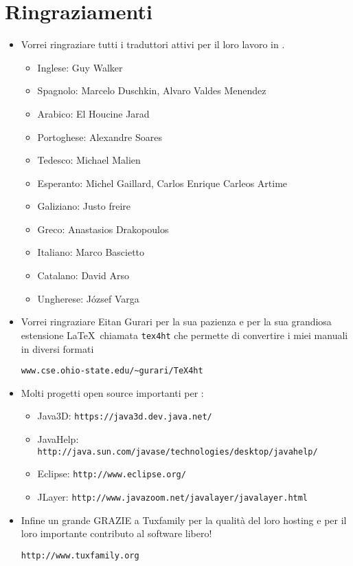 \chapter*{Ringraziamenti}
\begin{itemize}
	\item Vorrei ringraziare tutti i traduttori attivi per il loro lavoro in \xlogo.
	\vspace{0.2cm}
	\begin{itemize}
		\item Inglese: Guy Walker
		\item Spagnolo: Marcelo Duschkin, Alvaro Valdes Menendez
		\item Arabico: El Houcine Jarad
		\item Portoghese: Alexandre Soares
		\item Tedesco: Michael Malien
		\item Esperanto: Michel Gaillard, Carlos Enrique Carleos Artime
		\item Galiziano: Justo freire
		\item Greco: Anastasios Drakopoulos
		\item Italiano: Marco Bascietto
		\item Catalano: David Arso 
		\item Ungherese: József Varga
	\end{itemize}
	\vspace{0.5cm}
	\item Vorrei ringraziare Eitan Gurari per la sua pazienza e per la sua grandiosa estensione \LaTeX\ chiamata \texttt{tex4ht} che permette di convertire i miei manuali in diversi formati
	\begin{center}
		\texttt{www.cse.ohio-state.edu/\textasciitilde gurari/TeX4ht} 
	\end{center}
	\vspace{0.5cm}
	\item Molti progetti open source importanti per \xlogo:
	\vspace{0.2cm}
	\begin{itemize}
		\item Java3D: \texttt{https://java3d.dev.java.net/} \\
		\vspace{0.2cm}
		\item JavaHelp: \texttt{http://java.sun.com/javase/technologies/desktop/javahelp/} \\
		\vspace{0.2cm}
		\item Eclipse: \texttt{http://www.eclipse.org/} \\
		\vspace{0.2cm}
		\item JLayer: \texttt{http://www.javazoom.net/javalayer/javalayer.html} \\
	\end{itemize}
	\vspace{0.2cm}
	\item Infine un grande GRAZIE a Tuxfamily per la qualità del loro hosting e per il loro importante contributo al software libero!
	\begin{center}
		\texttt{http://www.tuxfamily.org}
	\end{center}
\end{itemize}